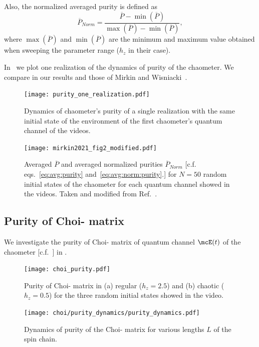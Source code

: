 Also, the normalized averaged purity is defined as
\begin{equation}\label{eq:avg:norm:purity}
\overline P_{Norm} = 
\frac{\overline P - \min(\overline P)}{\max(\overline P) - \min(\overline P)},
\end{equation}
where $\max(\overline P)$ and $\min(\overline P)$ are the minimum and maximum
value obtained when sweeping the parameter range ($h_z$ in their case). 

In~ we plot one realization of the dynamics 
of purity of the chaometer. 
We compare in  our results and those 
of Mirkin and Wisniacki~\cite{mirkin2021quantum}.

\begin{figure}
\centering
\texttt{[image: purity\_one\_realization.pdf]}
\caption{Dynamics of chaometer's purity of a single realization 
with the same initial state of the environment of the first chaometer's 
quantum channel of the videos.}
\label{fig:purity:one:realization}
\end{figure}

\begin{figure}
\centering
\texttt{[image: mirkin2021\_fig2\_modified.pdf]}
\caption{Averaged $\overline P$ and averaged normalized purities 
$\overline P_{Norm}$ [c.f. eqs.~\eqref{eq:avg:purity} and~\eqref{eq:avg:norm:purity}.] for $N=50$ random initial states of 
the chaometer for each quantum channel showed in the videos.
Taken and modified from Ref.~\cite{mirkin2021quantum}.}
\label{fig:mirkin2021:fig2:modified}
\end{figure}

\subsection{Purity of Choi-\jami{} matrix}%
We investigate the purity of Choi-\jami{} matrix of quantum channel $\mcE(t)$ 
of the chaometer [c.f.~] in .

\begin{figure}
\centering
\texttt{[image: choi\_purity.pdf]}
\caption{Purity of Choi-\jami{} matrix in (a) regular ($h_z=2.5$) and (b) chaotic ($h_z=0.5$) for the three random initial states showed in the video.}
\label{fig:choi:purity}
\end{figure}

\begin{figure}
\centering
\texttt{[image: choi/purity\_dynamics/purity\_dynamics.pdf]}
\caption{Dynamics of purity of the Choi-\jami{} matrix for various 
lengths $L$ of the spin chain.}
\label{fig:choi:purity:dynamics}
\end{figure}



